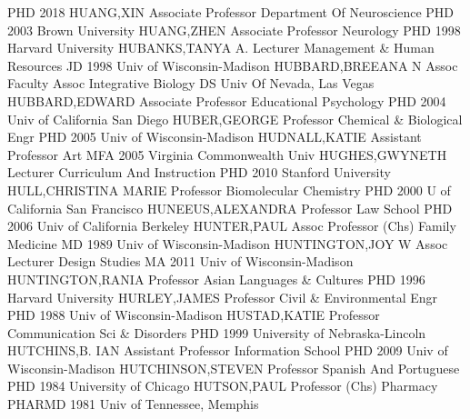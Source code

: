 \documentclass[
]{article}
\begin{document}
\textbar PHD 2018 \textbar{}  \textbar HUANG,XIN
\textbar Associate Professor \textbar Department Of Neuroscience
\textbar PHD 2003 Brown University \textbar{} 
\textbar HUANG,ZHEN \textbar Associate Professor \textbar Neurology
\textbar PHD 1998 Harvard University \textbar{} 
\textbar HUBANKS,TANYA A. \textbar Lecturer \textbar Management \& Human
Resources \textbar JD 1998 Univ of Wisconsin-Madison \textbar{}
 \textbar HUBBARD,BREEANA N \textbar Assoc Faculty Assoc
\textbar Integrative Biology \textbar DS Univ Of Nevada, Las Vegas
\textbar{}  \textbar HUBBARD,EDWARD \textbar Associate
Professor \textbar Educational Psychology \textbar PHD 2004 Univ of
California San Diego \textbar{}  \textbar HUBER,GEORGE
\textbar Professor \textbar Chemical \& Biological Engr \textbar PHD
2005 Univ of Wisconsin-Madison \textbar{} 
\textbar HUDNALL,KATIE \textbar Assistant Professor \textbar Art
\textbar MFA 2005 Virginia Commonwealth Univ \textbar{} 
\textbar HUGHES,GWYNETH \textbar Lecturer \textbar Curriculum And
Instruction \textbar PHD 2010 Stanford University \textbar{}
 \textbar HULL,CHRISTINA MARIE \textbar Professor
\textbar Biomolecular Chemistry \textbar PHD 2000 U of California San
Francisco \textbar{}  \textbar HUNEEUS,ALEXANDRA
\textbar Professor \textbar Law School \textbar PHD 2006 Univ of
California Berkeley \textbar{}  \textbar HUNTER,PAUL
\textbar Assoc Professor (Chs) \textbar Family Medicine \textbar MD 1989
Univ of Wisconsin-Madison \textbar{} 
\textbar HUNTINGTON,JOY W \textbar Assoc Lecturer \textbar Design
Studies \textbar MA 2011 Univ of Wisconsin-Madison \textbar{}
 \textbar HUNTINGTON,RANIA \textbar Professor \textbar Asian
Languages \& Cultures \textbar PHD 1996 Harvard University \textbar{}
 \textbar HURLEY,JAMES \textbar Professor \textbar Civil \&
Environmental Engr \textbar PHD 1988 Univ of Wisconsin-Madison
\textbar{}  \textbar HUSTAD,KATIE \textbar Professor
\textbar Communication Sci \& Disorders \textbar PHD 1999 University of
Nebraska-Lincoln \textbar{}  \textbar HUTCHINS,B. IAN
\textbar Assistant Professor \textbar Information School \textbar PHD
2009 Univ of Wisconsin-Madison \textbar{} 
\textbar HUTCHINSON,STEVEN \textbar Professor \textbar Spanish And
Portuguese \textbar PHD 1984 University of Chicago \textbar{}
 \textbar HUTSON,PAUL \textbar Professor (Chs)
\textbar Pharmacy \textbar PHARMD 1981 Univ of Tennessee, Memphis
\end{document}
